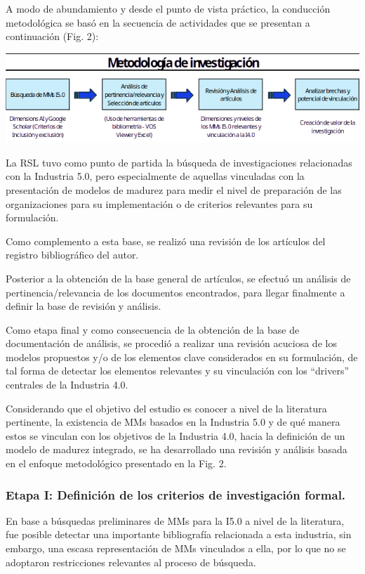 \documentclass{article}
\begin{document}
A modo de abundamiento y desde el punto de vista práctico, la conducción
metodológica se basó en la secuencia de actividades que se presentan a
continuación (Fig. 2):

\includegraphics{images/clipboard-1289737579.png}

La RSL tuvo como punto de partida la búsqueda de investigaciones
relacionadas con la Industria 5.0, pero especialmente de aquellas
vinculadas con la presentación de modelos de madurez para medir el nivel
de preparación de las organizaciones para su implementación o de
criterios relevantes para su formulación.

Como complemento a esta base, se realizó una revisión de los artículos
del registro bibliográfico del autor.

Posterior a la obtención de la base general de artículos, se efectuó un
análisis de pertinencia/relevancia de los documentos encontrados, para
llegar finalmente a definir la base de revisión y análisis.

Como etapa final y como consecuencia de la obtención de la base de
documentación de análisis, se procedió a realizar una revisión acuciosa
de los modelos propuestos y/o de los elementos clave considerados en su
formulación, de tal forma de detectar los elementos relevantes y su
vinculación con los ``drivers'' centrales de la Industria 4.0.

Considerando que el objetivo del estudio es conocer a nivel de la
literatura pertinente, la existencia de MMs basados en la Industria 5.0
y de qué manera estos se vinculan con los objetivos de la Industria 4.0,
hacia la definición de un modelo de madurez integrado, se ha
desarrollado una revisión y análisis basada en el enfoque metodológico
presentado en la Fig. 2.

\subsubsection{Etapa I: Definición de los criterios de investigación
formal.}\label{etapa-i-definiciuxf3n-de-los-criterios-de-investigaciuxf3n-formal.}

En base a búsquedas preliminares de MMs para la I5.0 a nivel de la
literatura, fue posible detectar una importante bibliografía relacionada
a esta industria, sin embargo, una escasa representación de MMs
vinculados a ella, por lo que no se adoptaron restricciones relevantes
al proceso de búsqueda.
\end{document}

